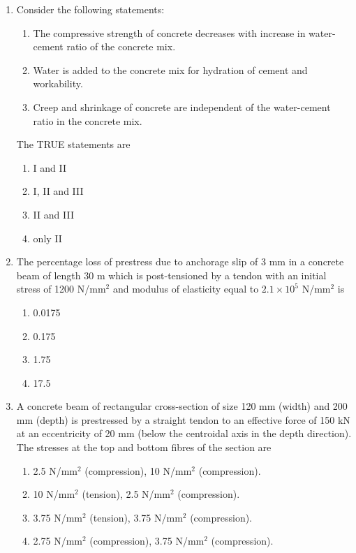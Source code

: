 \documentclass[journal,12pt,onecolumn]{IEEEtran}
\theoremstyle{remark}
\begin{document}
\begin{enumerate}
\item Consider the following statements:

\begin{enumerate}
\item The compressive strength of concrete decreases with increase in water-cement ratio of the concrete mix.
\item Water is added to the concrete mix for hydration of cement and workability.
\item Creep and shrinkage of concrete are independent of the water-cement ratio in the concrete mix.
\end{enumerate}
The TRUE statements are

\hfill{}
\begin{enumerate}
\item I and II
\item I, II and III
\item II and III
\item only II
\end{enumerate}

\item The percentage loss of prestress due to anchorage slip of 3 mm in a concrete beam of length 30 m which is post-tensioned by a tendon with an initial stress of 1200 N/mm$^2$ and modulus of elasticity equal to $2.1\times10^5$ N/mm$^2$ is

\hfill{}
\begin{enumerate}
\item 0.0175
\item 0.175
\item 1.75
\item 17.5
\end{enumerate}

\item A concrete beam of rectangular cross-section of size 120 mm (width) and 200 mm (depth) is prestressed by a straight tendon to an effective force of 150 kN at an eccentricity of 20 mm (below the centroidal axis in the depth direction). The stresses at the top and bottom fibres of the section are

\hfill{}
\begin{enumerate}
\item 2.5 N/mm$^2$ (compression), 10 N/mm$^2$ (compression).
\item 10 N/mm$^2$ (tension), 2.5 N/mm$^2$ (compression).
\item 3.75 N/mm$^2$ (tension), 3.75 N/mm$^2$ (compression).
\item 2.75 N/mm$^2$ (compression), 3.75 N/mm$^2$ (compression).
\end{enumerate}


\end{enumerate}
\end{document}

